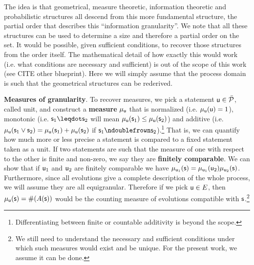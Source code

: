 \documentclass[10pt, onecolumn, longbibliography, nofootinbib]{revtex4-2}
\begin{document}
The idea is that geometrical, measure theoretic, information theoretic and probabilistic structures all descend from this more fundamental structure, the partial order that describes this ``information granularity''. We note that all these structures can be used to determine a size and therefore a partial order on the set. It would be possible, given sufficient conditions, to recover those structures from the order itself. The mathematical detail of how exactly this would work (i.e. what conditions are necessary and sufficient) is out of the scope of this work (see CITE other blueprint). Here we will simply assume that the process domain is such that the geometrical structures can be rederived.

\textbf{Measures of granularity}. To recover measures, we pick a statement $\stmt[u] \in \tdomain[P]$, called unit, and construct a \textbf{measure} $\mu_{\stmt[u]}$ that is normalized (i.e. $\mu_{\stmt[u]}(\stmt[u]) = 1$), monotonic (i.e. $\stmt_1 \finer \stmt_2$ will mean $\mu_{\stmt[u]}(\stmt_1) \leq \mu_{\stmt[u]}(\stmt_2)$) and additive (i.e. $\mu_{\stmt[u]}(\stmt_1 \OR \stmt_2) = \mu_{\stmt[u]}(\stmt_1) + \mu_{\stmt[u]}(\stmt_2)$ if $\stmt_1 \ncomp \stmt_2$).\footnote{Differentiating between finite or countable additivity is beyond the scope.} That is, we can quantify how much more or less precise a statement is compared to a fixed statement taken as a unit. If two statements are such that the measure of one with respect to the other is finite and non-zero, we say they are \textbf{finitely comparable}. We can show that if $\stmt[u]_1$ and $\stmt[u]_2$ are finitely comparable we have $ \mu_{\stmt[u]_1}(\stmt) = \mu_{\stmt[u]_1}(\stmt[u]_2) \mu_{\stmt[u]_2}(\stmt)$. Furthermore, since all evolutions give a complete description of the whole process, we will assume they are all equigranular. Therefore if we pick $\stmt[u] \in E$, then $\mu_{\stmt[u]}(\stmt)=\#(A(\stmt))$ would be the counting measure of evolutions compatible with $\stmt$.\footnote{We still need to understand the necessary and sufficient conditions under which such measures would exist and be unique. For the present work, we assume it can be done.}
\end{document}
